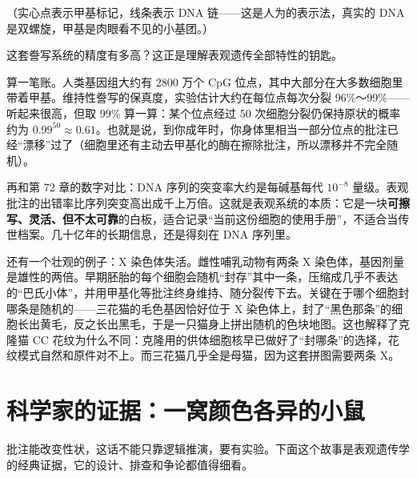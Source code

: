 （实心点表示甲基标记，线条表示 DNA 链——这是人为的表示法，真实的 DNA 是双螺旋，甲基是肉眼看不见的小基团。）

这套誊写系统的精度有多高？这正是理解表观遗传全部特性的钥匙。

\begin{qiaoliang}
算一笔账。人类基因组大约有 2800 万个 CpG 位点，其中大部分在大多数细胞里带着甲基。维持性誊写的保真度，实验估计大约在每位点每次分裂 96\%～99\%——听起来很高，但取 99\% 算一算：某个位点经过 50 次细胞分裂仍保持原状的概率约为 $0.99^{50}\approx 0.61$。也就是说，到你成年时，你身体里相当一部分位点的批注已经“漂移”过了（细胞里还有主动去甲基化的酶在擦除批注，所以漂移并不完全随机）。

再和第 72 章的数字对比：DNA 序列的突变率大约是每碱基每代 $10^{-8}$ 量级。表观批注的出错率比序列突变高出成千上万倍。这就是表观系统的本质：它是一块\textbf{可擦写、灵活、但不太可靠}的白板，适合记录“当前这份细胞的使用手册”，不适合当传世档案。几十亿年的长期信息，还是得刻在 DNA 序列里。
\end{qiaoliang}

还有一个壮观的例子：X 染色体失活。雌性哺乳动物有两条 X 染色体，基因剂量是雄性的两倍。早期胚胎的每个细胞会随机“封存”其中一条，压缩成几乎不表达的“巴氏小体”，并用甲基化等批注终身维持、随分裂传下去。关键在于哪个细胞封哪条是随机的——三花猫的毛色基因恰好位于 X 染色体上，封了“黑色那条”的细胞长出黄毛，反之长出黑毛，于是一只猫身上拼出随机的色块地图。这也解释了克隆猫 CC 花纹为什么不同：克隆用的供体细胞核早已做好了“封哪条”的选择，花纹模式自然和原件对不上。而三花猫几乎全是母猫，因为这套拼图需要两条 X。

\section{科学家的证据：一窝颜色各异的小鼠}

批注能改变性状，这话不能只靠逻辑推演，要有实验。下面这个故事是表观遗传学的经典证据，它的设计、排查和争论都值得细看。

